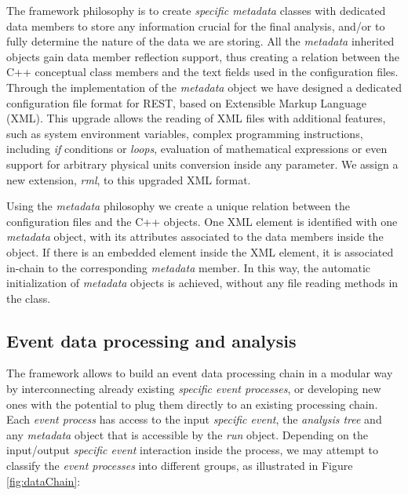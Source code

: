 The framework philosophy is to create \emph{specific metadata} classes with dedicated data members to store any information crucial for the final analysis, and/or to fully determine the nature of the data we are storing. All the \emph{metadata} inherited objects gain data member reflection support, thus creating a relation between the C++ conceptual class members and the text fields used in the configuration files. Through the implementation of the \emph{metadata} object we have designed a dedicated configuration file format for REST, based on Extensible Markup Language (XML). This upgrade allows the reading of XML files with additional features, such as system environment variables, complex programming instructions, including \emph{if} conditions or \emph{loops}, evaluation of mathematical expressions or even support for arbitrary physical units conversion inside any parameter. We assign a new extension, \emph{rml}, to this upgraded XML format.

Using the \emph{metadata} philosophy we create a unique relation between the configuration files and the C++ objects. One XML element is identified with one \emph{metadata} object, with its attributes associated to the data members inside the object. If there is an embedded element inside the XML element, it is associated in-chain to the corresponding \emph{metadata} member. In this way, the automatic initialization of \emph{metadata} objects is achieved, without any file reading methods in the class.

\subsection{Event data processing and analysis}

The framework allows to build an event data processing chain in a modular way by interconnecting already existing \emph{specific event processes}, or developing new ones with the potential to plug them directly to an existing processing chain. Each \emph{event process} has access to the input \emph{specific event}, the \emph{analysis tree} and any \emph{metadata} object that is accessible by the \emph{run} object. Depending on the input/output \emph{specific event} interaction inside the process, we may attempt to classify the \emph{event processes} into different groups, as illustrated in Figure\,\ref{fig:dataChain}:

